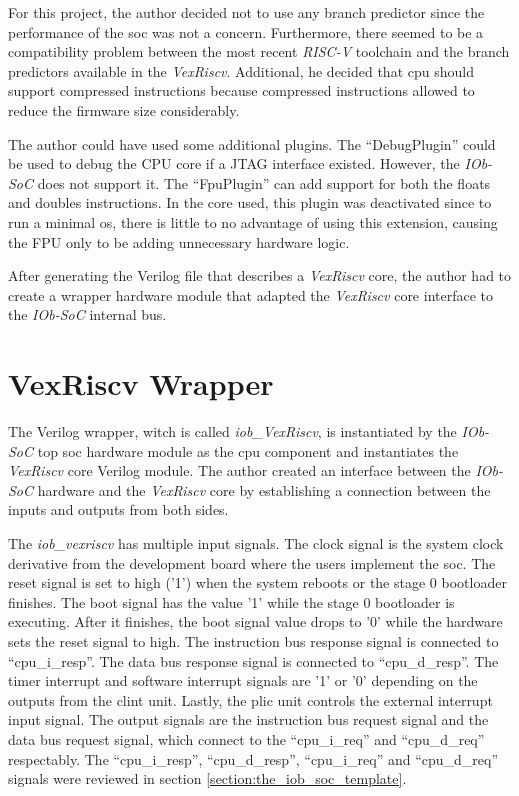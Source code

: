 For this project, the author decided not to use any branch predictor since the performance of the \acrshort{soc} was not a concern. Furthermore, there seemed to be a compatibility problem between the most recent \textit{RISC-V} toolchain and the branch predictors available in the \textit{VexRiscv}. Additional, he decided that \acrshort{cpu} should support compressed instructions because compressed instructions allowed to reduce the firmware size considerably. 

The author could have used some additional plugins. The \enquote{DebugPlugin} could be used to debug the CPU core if a JTAG interface existed. However, the \textit{IOb-SoC} does not support it. The \enquote{FpuPlugin} can add support for both the floats and doubles instructions. In the core used, this plugin was deactivated since to run a minimal \acrshort{os}, there is little to no advantage of using this extension, causing the FPU only to be adding unnecessary hardware logic.

After generating the Verilog file that describes a \textit{VexRiscv} core, the author had to create a wrapper hardware module that adapted the \textit{VexRiscv} core interface to the \textit{IOb-SoC} internal bus.

\section{VexRiscv Wrapper}
The Verilog wrapper, witch is called \textit{iob\_VexRiscv}, is instantiated by the \textit{IOb-SoC} top \acrshort{soc} hardware module as the \acrshort{cpu} component and instantiates the \textit{VexRiscv} core Verilog module. The author created an interface between the \textit{IOb-SoC} hardware and the \textit{VexRiscv} core by establishing a connection between the inputs and outputs from both sides.

The \textit{iob\_vexriscv} has multiple input signals. The clock signal is the system clock derivative from the development board where the users implement the \acrshort{soc}. The reset signal is set to high ('1') when the system reboots or the stage 0 bootloader finishes. The boot signal has the value '1' while the stage 0 bootloader is executing. After it finishes, the boot signal value drops to '0' while the hardware sets the reset signal to high. The instruction bus response signal is connected to \enquote{cpu\_i\_resp}. The data bus response signal is connected to \enquote{cpu\_d\_resp}. The timer interrupt and software interrupt signals are '1' or '0' depending on the outputs from the \acrshort{clint} unit. Lastly, the \acrshort{plic} unit controls the external interrupt input signal. The output signals are the instruction bus request signal and the data bus request signal, which connect to the \enquote{cpu\_i\_req} and \enquote{cpu\_d\_req} respectably. The \enquote{cpu\_i\_resp}, \enquote{cpu\_d\_resp}, \enquote{cpu\_i\_req} and \enquote{cpu\_d\_req} signals were reviewed in section \ref{section:the_iob_soc_template}.


